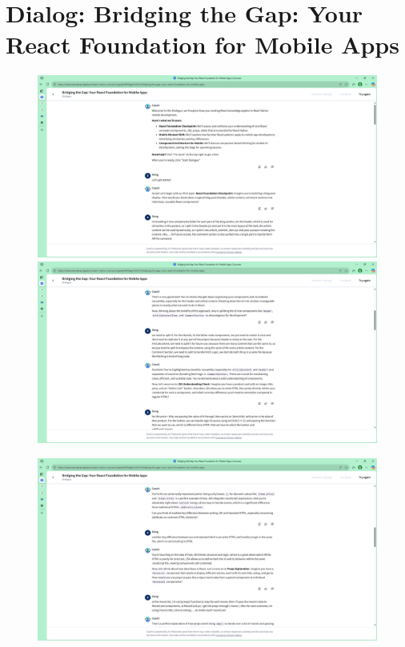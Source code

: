 \section{Dialog: Bridging the Gap: Your React Foundation for Mobile Apps}
\begin{center}
  \begin{figure}[H]
      \centering
      \begin{minipage}{0.45\linewidth}
        \centering
        \includegraphics[width=\textwidth]{images/1.pdf}\\
        \includegraphics[width=\textwidth]{images/2.pdf}
      \end{minipage}
      \hfill
      \begin{minipage}{0.45\linewidth}
        \centering
        \includegraphics[width=\textwidth]{images/3.pdf}\\

\end{minipage}
\end{figure}
\end{center}
